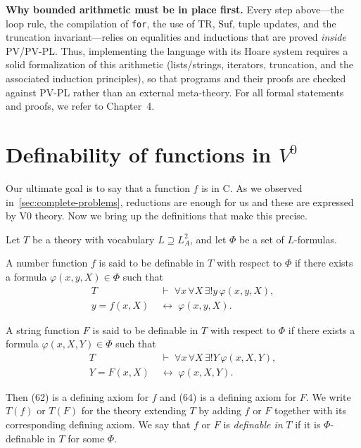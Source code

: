 \medskip
\noindent\textbf{Why bounded arithmetic must be in place first.}
Every step above---the loop rule, the compilation of \texttt{for}, the use of \(\mathrm{TR}\), \(\mathrm{Suf}\), tuple updates, and the truncation invariant---relies on equalities and inductions that are proved \emph{inside} PV/PV-PL.\@
Thus, implementing the language with its Hoare system requires a solid formalization of this arithmetic (lists/strings, iterators, truncation, and the associated induction principles), so that programs and their proofs are checked against PV-PL rather than an external meta-theory.
For all formal statements and proofs, we refer to Chapter~4.

\section{Definability of functions in \texorpdfstring{$V^0$}{V0}}
Our ultimate goal is to say that a function $f$ is in C.
As we observed in~\ref{sec:complete-problems},  reductions are enough for us
and these are expressed by V0 theory. Now we bring up the definitions that make this precise.

\begin{definition}
Let \(T\) be a theory with vocabulary \(L \supseteq L^2_A\), and let \(\Phi\) be a set of \(L\)-formulas.

\medskip
A number function \(f\) is said to be definable in \(T\) with respect to \(\Phi\) if there exists a formula
\(\varphi(x, y, X) \in \Phi\) such that
\begin{align}
T &\;\vdash\; \forall x \, \forall X \, \exists! y \, \varphi(x, y, X), \tag{61} \\[4pt]
y = f(x, X) &\;\leftrightarrow\; \varphi(x, y, X). \tag{62}
\end{align}

\medskip
A string function \(F\) is said to be definable in \(T\) with respect to \(\Phi\) if there exists a formula
\(\varphi(x, X, Y) \in \Phi\) such that
\begin{align}
T &\;\vdash\; \forall x \, \forall X \, \exists! Y \, \varphi(x, X, Y), \tag{63} \\[4pt]
Y = F(x, X) &\;\leftrightarrow\; \varphi(x, X, Y). \tag{64}
\end{align}

\medskip
Then \textup{(62)} is a defining axiom for \(f\) and \textup{(64)} is a defining axiom for \(F\).
We write \(T(f)\) or \(T(F)\) for the theory extending \(T\) by adding \(f\) or \(F\)
together with its corresponding defining axiom.
We say that \(f\) or \(F\) is \textit{definable in} \(T\) if it is \(\Phi\)-definable in \(T\)
for some \(\Phi\).
\end{definition}


